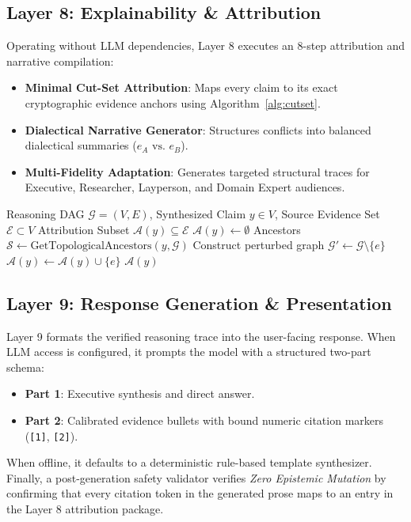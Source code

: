 \documentclass[journal,compsoc]{IEEEtran}
\begin{document}
\subsection{Layer 8: Explainability \& Attribution}
Operating without LLM dependencies, Layer 8 executes an 8-step attribution and narrative compilation:
\begin{itemize}
    \item \textbf{Minimal Cut-Set Attribution}: Maps every claim to its exact cryptographic evidence anchors using Algorithm~\ref{alg:cutset}.
    \item \textbf{Dialectical Narrative Generator}: Structures conflicts into balanced dialectical summaries ($e_A \text{ vs. } e_B$).
    \item \textbf{Multi-Fidelity Adaptation}: Generates targeted structural traces for Executive, Researcher, Layperson, and Domain Expert audiences.
\end{itemize}

\begin{algorithm}[!t]
\caption{Minimal Cut-Set Attribution}
\label{alg:cutset}
\begin{algorithmic}[1]
\REQUIRE Reasoning DAG $\mathcal{G} = (V, E)$, Synthesized Claim $y \in V$, Source Evidence Set $\mathcal{E} \subset V$
\ENSURE Attribution Subset $\mathcal{A}(y) \subseteq \mathcal{E}$
\STATE $\mathcal{A}(y) \leftarrow \emptyset$
\STATE Ancestors $\mathcal{S} \leftarrow \text{GetTopologicalAncestors}(y, \mathcal{G})$
    \STATE Construct perturbed graph $\mathcal{G}' \leftarrow \mathcal{G} \setminus \{e\}$
        \STATE $\mathcal{A}(y) \leftarrow \mathcal{A}(y) \cup \{e\}$
    \ENDIF
\ENDFOR
\RETURN $\mathcal{A}(y)$
\end{algorithmic}
\end{algorithm}

\subsection{Layer 9: Response Generation \& Presentation}
Layer 9 formats the verified reasoning trace into the user-facing response. When LLM access is configured, it prompts the model with a structured two-part schema:
\begin{itemize}
    \item \textbf{Part 1}: Executive synthesis and direct answer.
    \item \textbf{Part 2}: Calibrated evidence bullets with bound numeric citation markers (\texttt{[1]}, \texttt{[2]}).
\end{itemize}
When offline, it defaults to a deterministic rule-based template synthesizer. Finally, a post-generation safety validator verifies \textit{Zero Epistemic Mutation} by confirming that every citation token in the generated prose maps to an entry in the Layer 8 attribution package.
\end{document}
